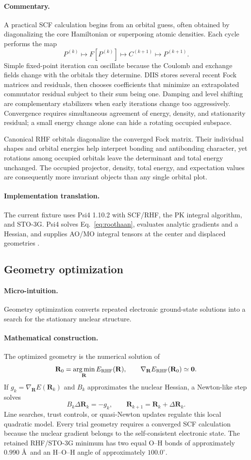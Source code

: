 \documentclass[10pt,twocolumn]{article}
\newcommand{\micro}{\paragraph{Micro-intuition.}}
\newcommand{\mathderiv}{\paragraph{Mathematical construction.}}
\newcommand{\commentaryblock}{\paragraph{Commentary.}}
\newcommand{\impl}{\paragraph{Implementation translation.}}
\begin{document}
\commentaryblock A practical SCF calculation begins from an orbital guess,
often obtained by diagonalizing the core Hamiltonian or superposing atomic
densities.  Each cycle performs the map
\begin{equation}
P^{(k)}\longmapsto F[P^{(k)}]
\longmapsto C^{(k+1)}\longmapsto P^{(k+1)}.
\label{eq:scf-map}
\end{equation}
Simple fixed-point iteration can oscillate because the Coulomb and exchange
fields change with the orbitals they determine.  DIIS stores several recent
Fock matrices and residuals, then chooses coefficients that minimize an
extrapolated commutator residual subject to their sum being one.  Damping and
level shifting are complementary stabilizers when early iterations change too
aggressively.  Convergence requires simultaneous agreement of energy, density,
and stationarity residual; a small energy change alone can hide a rotating
occupied subspace.

Canonical RHF orbitals diagonalize the converged Fock matrix.  Their individual
shapes and orbital energies help interpret bonding and antibonding character,
yet rotations among occupied orbitals leave the determinant and total energy
unchanged.  The occupied projector, density, total energy, and expectation
values are consequently more invariant objects than any single orbital plot.

\impl The current fixture uses Psi4 1.10.2 with SCF/RHF, the PK integral
algorithm, and STO-3G.  Psi4 solves Eq.~\eqref{eq:roothaan}, evaluates analytic
gradients and a Hessian, and supplies AO/MO integral tensors at the center and
displaced geometries \cite{Psi4}.

\subsection*{Geometry optimization}

\micro Geometry optimization converts repeated electronic ground-state
solutions into a search for the stationary nuclear structure.

\mathderiv The optimized geometry is the numerical solution of
\begin{equation}
\mathbf R_0=\operatorname*{arg\,min}_{\mathbf R}E_{\rm RHF}(\mathbf R),
\qquad
\nabla_{\mathbf R}E_{\rm RHF}(\mathbf R_0)\simeq\mathbf0.
\label{eq:geometry-opt}
\end{equation}
If $g_k=\nabla_{\mathbf R}E(\mathbf R_k)$ and $B_k$ approximates the nuclear
Hessian, a Newton-like step solves
\begin{equation}
B_k\Delta\mathbf R_k=-g_k,\qquad
\mathbf R_{k+1}=\mathbf R_k+\Delta\mathbf R_k.
\label{eq:geometry-step}
\end{equation}
Line searches, trust controls, or quasi-Newton updates regulate this local
quadratic model.  Every trial geometry requires a converged SCF calculation
because the nuclear gradient belongs to the self-consistent electronic state.
The retained RHF/STO-3G minimum has two equal O--H bonds of approximately
$0.990$ \AA\ and an H--O--H angle of approximately $100.0^\circ$.
\end{document}
